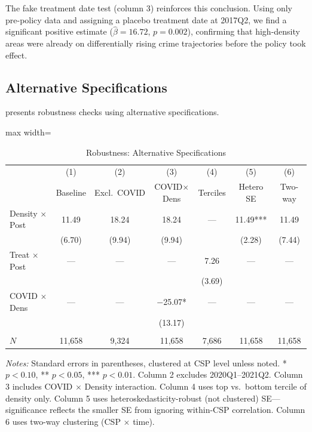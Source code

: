 \documentclass[12pt]{article}
\begin{document}
The fake treatment date test (column 3) reinforces this conclusion. Using only pre-policy data and assigning a placebo treatment date at 2017Q2, we find a significant positive estimate ($\hat{\beta} = 16.72$, $p = 0.002$), confirming that high-density areas were already on differentially rising crime trajectories before the policy took effect.

\subsection{Alternative Specifications}

 presents robustness checks using alternative specifications.

\begin{table}[H]
\centering
\caption{Robustness: Alternative Specifications}
\label{tab:robustness}
\begin{adjustbox}{max width=\textwidth}
\begin{threeparttable}
\begin{tabular}{lcccccc}
\toprule
& (1) & (2) & (3) & (4) & (5) & (6) \\
& Baseline & Excl.\ COVID & COVID$\times$Dens & Terciles & Hetero SE & Two-way \\
\midrule
Density $\times$ Post & 11.49 & 18.24 & 18.24 & --- & 11.49*** & 11.49 \\
& (6.70) & (9.94) & (9.94) & & (2.28) & (7.44) \\
Treat $\times$ Post & --- & --- & --- & 7.26 & --- & --- \\
& & & & (3.69) & & \\
COVID $\times$ Dens & --- & --- & $-$25.07* & --- & --- & --- \\
& & & (13.17) & & & \\
\\
$N$ & 11,658 & 9,324 & 11,658 & 7,686 & 11,658 & 11,658 \\
\bottomrule
\end{tabular}
\begin{tablenotes}[flushleft]
\small
\item \textit{Notes:} Standard errors in parentheses, clustered at CSP level unless noted. * $p<0.10$, ** $p<0.05$, *** $p<0.01$. Column 2 excludes 2020Q1--2021Q2. Column 3 includes COVID $\times$ Density interaction. Column 4 uses top vs.\ bottom tercile of density only. Column 5 uses heteroskedasticity-robust (not clustered) SE---significance reflects the smaller SE from ignoring within-CSP correlation. Column 6 uses two-way clustering (CSP $\times$ time).
\end{tablenotes}
\end{threeparttable}
\end{adjustbox}
\end{table}
\end{document}
